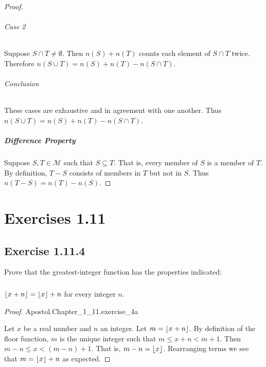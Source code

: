 \documentclass{report}
\begin{document}
\begin{proof}
    \subparagraph{Case 2}%

      Suppose $S \cap T \neq \emptyset$.
      Then $n(S) + n(T)$ counts each element of $S \cap T$ twice.
      Therefore $n(S \cup T) = n(S) + n(T) - n(S \cap T)$.

    \subparagraph{Conclusion}%

      These cases are exhaustive and in agreement with one another.
      Thus $n(S \cup T) = n(S) + n(T) - n(S \cap T)$.

  \paragraph{Difference Property}%

    Suppose $S, T \in \mathscr{M}$ such that $S \subseteq T$.
    That is, every member of $S$ is a member of $T$.
    By definition, $T - S$ consists of members in $T$ but not in $S$.
    Thus $n(T - S) = n(T) - n(S)$.

\end{proof}

\chapter{Exercises 1.11}%
\label{chap:exercises-1-11}

\section{Exercise 1.11.4}%
\label{sec:exercise-1.11.4}

Prove that the greatest-integer function has the properties indicated:

\subsection{}%
\label{sub:exercise-1.11.4a}

$\left\lfloor x + n\right\rfloor = \left\lfloor x\right\rfloor + n$ for every integer $n$.

\begin{proof}

    {Apostol.Chapter\_1\_11.exercise\_4a}

  Let $x$ be a real number and $n$ an integer.
  Let $m = \left\lfloor x + n\right\rfloor$.
  By definition of the floor function, $m$ is the unique integer such that
    $m \leq x + n < m + 1$.
  Then $m - n \leq x < (m - n) + 1$.
  That is, $m - n = \left\lfloor x\right\rfloor$.
  Rearranging terms we see that $m = \left\lfloor x\right\rfloor + n$ as expected.

\end{proof}
\end{document}
